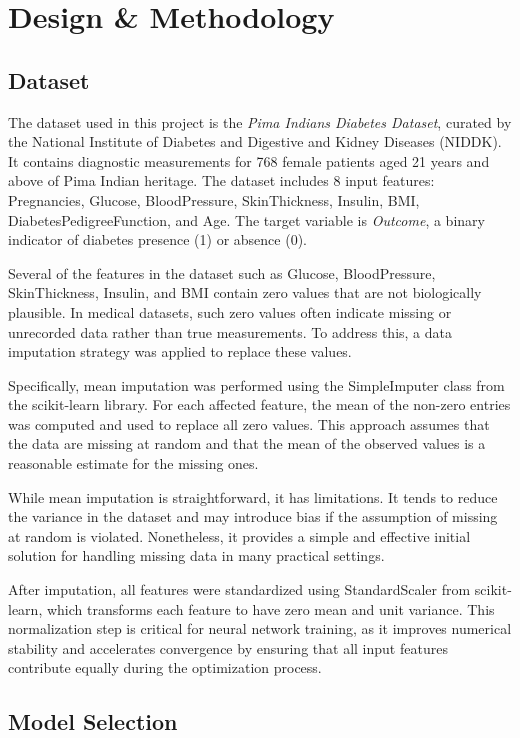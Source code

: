 \section{Design \& Methodology}

\subsection{Dataset}

The dataset used in this project is the \textit{Pima Indians Diabetes Dataset}, curated by the National Institute of Diabetes and Digestive and Kidney Diseases (NIDDK). It contains diagnostic measurements for 768 female patients aged 21 years and above of Pima Indian heritage. The dataset includes 8 input features: Pregnancies, Glucose, BloodPressure, SkinThickness, Insulin, BMI, DiabetesPedigreeFunction, and Age. The target variable is \textit{Outcome}, a binary indicator of diabetes presence (1) or absence (0). 

Several of the features in the dataset such as Glucose, BloodPressure, SkinThickness, Insulin, and BMI contain zero values that are not biologically plausible. In medical datasets, such zero values often indicate missing or unrecorded data rather than true measurements. To address this, a data imputation strategy was applied to replace these values.

Specifically, mean imputation was performed using the SimpleImputer class from the scikit-learn library. For each affected feature, the mean of the non-zero entries was computed and used to replace all zero values. This approach assumes that the data are missing at random and that the mean of the observed values is a reasonable estimate for the missing ones.

While mean imputation is straightforward, it has limitations. It tends to reduce the variance in the dataset and may introduce bias if the assumption of missing at random is violated. Nonetheless, it provides a simple and effective initial solution for handling missing data in many practical settings.

After imputation, all features were standardized using StandardScaler from scikit-learn, which transforms each feature to have zero mean and unit variance. This normalization step is critical for neural network training, as it improves numerical stability and accelerates convergence by ensuring that all input features contribute equally during the optimization process.


\subsection{Model Selection}

